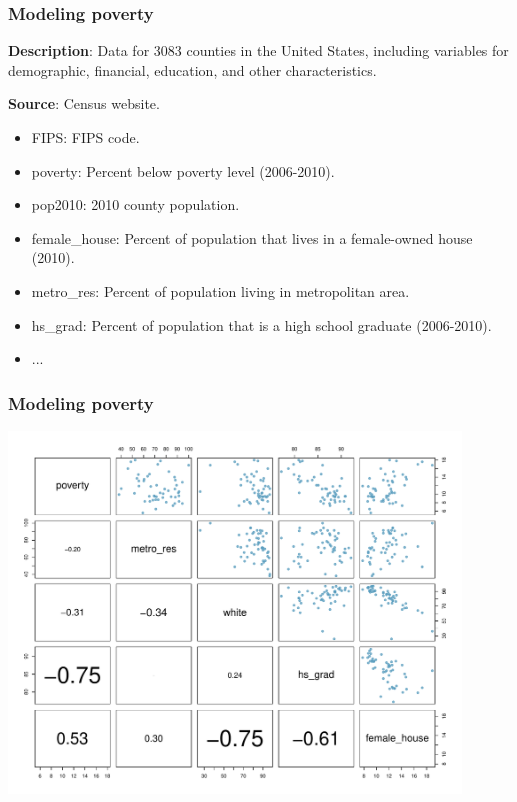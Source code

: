 \begin{frame}
\frametitle{Modeling poverty}


{\bf Description}: Data for 3083 counties in the United States, including variables for demographic, financial, education, and other characteristics.

{\bf Source}: Census website.

\begin{itemize}
    \item FIPS: FIPS code.
    \item poverty: Percent below poverty level (2006-2010).
    \item pop2010: 2010 county population.
    \item female\_house: Percent of population that lives in a female-owned house (2010).
    \item metro\_res: Percent of population living in metropolitan area.
    \item hs\_grad: Percent of population that is a high school graduate (2006-2010).
    \item ...
\end{itemize}

\end{frame}


\begin{frame}
\frametitle{Modeling poverty}

\vspace{-0.75cm}

\begin{center}
\includegraphics[width=0.9\textwidth]{8-1_intro_mlr/figures/poverty/poverty}
\end{center}

\end{frame}

